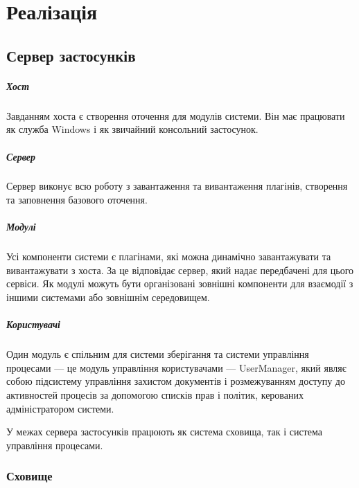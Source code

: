 \documentclass{memoir}
\begin{document}
\chapter{Реалізація}

\section{Сервер застосунків}

\paragraph{Хост}

Завданням хоста є створення оточення для модулів системи. Він має працювати як служба Windows і як звичайний консольний застосунок.

\paragraph{Сервер}

Сервер виконує всю роботу з завантаження та вивантаження плагінів, створення та заповнення базового оточення.

\paragraph{Модулі}

Усі компоненти системи є плагінами, які можна динамічно завантажувати та вивантажувати з хоста. За це відповідає сервер, який надає передбачені для цього сервіси. Як модулі можуть бути організовані зовнішні компоненти для взаємодії з іншими системами або зовнішнім середовищем.

\paragraph{Користувачі}

Один модуль є спільним для системи зберігання та системи управління процесами — це модуль управління користувачами — UserManager, який являє собою підсистему управління захистом документів і розмежуванням доступу до активностей процесів за допомогою списків прав і політик, керованих адміністратором системи.

У межах сервера застосунків працюють як система сховища, так і система управління процесами.

\subsection{Сховище}
\end{document}
